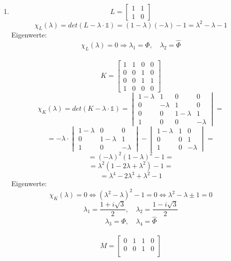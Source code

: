 \begin{enumerate}
\item
  \[ L = \begin{bmatrix} 1 & 1 \\ 1 & 0 \end{bmatrix} \]
  \[ \chi_L(\lambda) = det(L - \lambda \cdot \mathds{1}) 
     = (1 - \lambda)(-\lambda) - 1 = \lambda^2 - \lambda - 1 \]
  Eigenwerte:
  \[ \chi_L(\lambda) = 0 \Rightarrow \lambda_1 
     = \Phi, \quad \lambda_2 = \hat \Phi \] \\[2em]
  \[ K = \begin{bmatrix} 1 & 1 & 0 & 0 \\ 0 & 0 & 1 & 0 \\
                         0 & 0 & 1 & 1 \\ 1 & 0 & 0 & 0 \end{bmatrix} \]
  \[ \chi_K(\lambda) = det(K - \lambda \cdot \mathds{1})
     = \begin{vmatrix} 1-\lambda & 1 & 0 & 0 \\
                       0 & -\lambda & 1 & 0 \\
                       0 & 0 & 1-\lambda & 1 \\
                       1 & 0 & 0 & -\lambda \end{vmatrix} = \]
  \[ = -\lambda \cdot \begin{vmatrix} 1-\lambda & 0 & 0 \\ 
                                      0 & 1-\lambda & 1 \\
                                      1 & 0 & -\lambda \end{vmatrix} -
                      \begin{vmatrix} 1-\lambda & 1 & 0 \\
                                      0 & 0 & 1 \\
                                      1 & 0 & -\lambda \end{vmatrix} = \]
  \[ = (-\lambda)^2 (1-\lambda)^2 - 1 = \]
  \[ = \lambda^2 (1 - 2\lambda + \lambda^2) - 1 = \]
  \[ = \lambda^4 - 2\lambda^3 +\lambda^2 - 1 \]
  Eigenwerte:
  \[ \chi_K(\lambda) = 0 \Leftrightarrow (\lambda^2 - \lambda)^2 - 1 
     = 0 \Leftrightarrow \lambda^2 - \lambda \pm 1 = 0 \]
  \[ \lambda_1 = \frac{1 + i\sqrt{3}}{2}, \quad
     \lambda_2 = \frac{1 - i\sqrt{3}}{2} \]
  \[ \lambda_3 = \Phi, \quad \lambda_4 = \hat \Phi \] \\[2em]
  \[ M = \begin{bmatrix} 0 & 1 & 1 & 0 \\ 0 & 0 & 1 & 0 \\

\end{bmatrix}\]
\end{enumerate}
